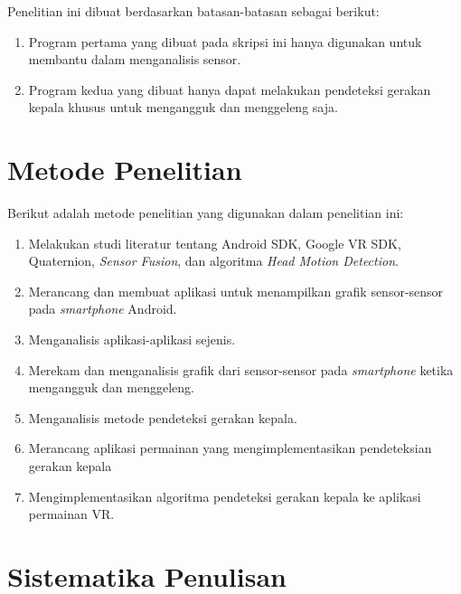 Penelitian ini dibuat berdasarkan batasan-batasan sebagai berikut: 
\begin{enumerate}
	\item Program pertama yang dibuat pada skripsi ini hanya digunakan untuk membantu dalam menganalisis sensor.
	\item Program kedua yang dibuat hanya dapat melakukan pendeteksi gerakan kepala khusus untuk mengangguk dan menggeleng saja.
\end{enumerate}

\section{Metode Penelitian}

Berikut adalah metode penelitian yang digunakan dalam penelitian ini:
	\begin{enumerate}
		\item Melakukan studi literatur tentang Android SDK, Google VR SDK, Quaternion, \textit{Sensor Fusion}, dan algoritma \textit{Head Motion Detection}.
		\item Merancang dan membuat aplikasi untuk menampilkan grafik sensor-sensor pada \textit{smartphone} Android.
		\item Menganalisis aplikasi-aplikasi sejenis.
		\item Merekam dan menganalisis grafik dari sensor-sensor pada \textit{smartphone} ketika mengangguk dan menggeleng.
		\item Menganalisis metode pendeteksi gerakan kepala.
		\item Merancang aplikasi permainan yang mengimplementasikan pendeteksian gerakan kepala
		\item Mengimplementasikan algoritma pendeteksi gerakan kepala ke aplikasi permainan VR.
	\end{enumerate}
\section{Sistematika Penulisan}

